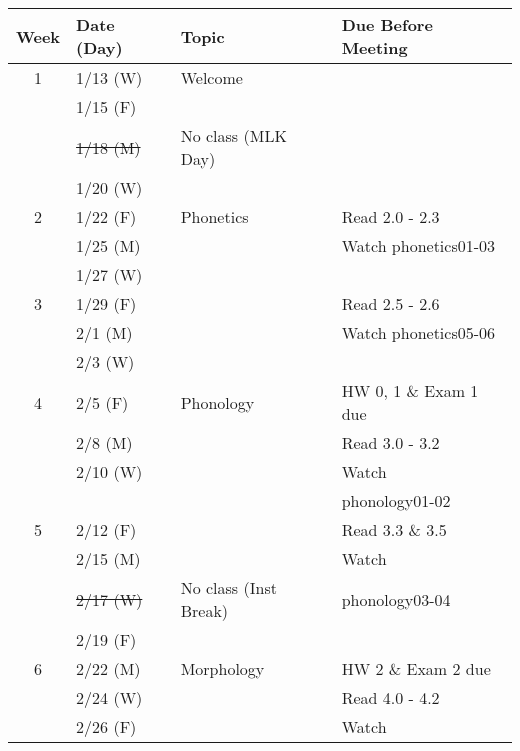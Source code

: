 \documentclass{article}
\begin{document}
    \begin{longtable}{c l l | l}
      Week  & Date (Day)  & Topic                           & Due Before Meeting \\
      \hline
      \hline
      1     & 1/13 (W)    & Welcome                         & \\
            & 1/15 (F)    &                                 & \\
            & \sout{1/18 (M)} & No class (MLK Day)          & \\
            & 1/20 (W)    &                                 & \\
      \hline
      2     & 1/22 (F)    & Phonetics                       & Read 2.0 - 2.3\\
            & 1/25 (M)    &                                 & Watch phonetics01-03\\
            & 1/27 (W)    &                                 & \\
      \hline
      3     & 1/29 (F)    &                                 & Read 2.5 - 2.6\\
            & 2/1  (M)    &                                 & Watch phonetics05-06\\
            & 2/3  (W)    &                                 & \\
      \hline
      4     & 2/5  (F)    & Phonology                       & HW 0, 1 \& Exam 1 due\\
            & 2/8  (M)    &                                 & Read 3.0 - 3.2\\
            & 2/10 (W)    &                                 & Watch\\
            &             &                                 & phonology01-02\\
      \hline
      5     & 2/12 (F)    &                                 & Read 3.3 \& 3.5\\
            & 2/15 (M)    &                                 & Watch\\
            & \sout{2/17 (W)} & No class (Inst Break)       & phonology03-04\\
            & 2/19 (F)    &                                 & \\
      \hline
      6     & 2/22 (M)    & Morphology                      & HW 2 \& Exam 2 due\\
            & 2/24 (W)    &                                 & Read 4.0 - 4.2\\
            & 2/26 (F)    &                                 & Watch\\

\end{longtable}
\end{document}
